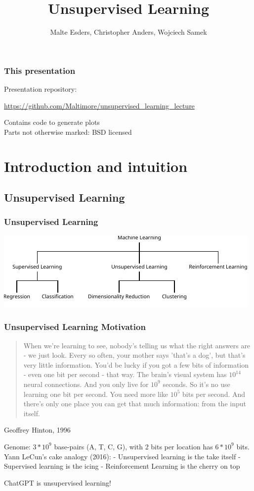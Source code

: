 \documentclass[Nike]{tuberlinbeamer}
\title{Unsupervised Learning}
\author{Malte Esders, Christopher Anders, Wojciech Samek}
\institute{Technische Universität Berlin - Machine Learning Group}
\begin{document}
\frame{\titlepage}


\begin{frame}
  \frametitle{This presentation}
  Presentation repository: \\
  \begin{center}
    \url{https://github.com/Maltimore/unsupervised_learning_lecture}\\
  \end{center}
  Contains code to generate plots\\
  Parts not otherwise marked: BSD licensed
\end{frame}


\section{Introduction and intuition}
\subsection{Unsupervised Learning}

\begin{frame}
 \frametitle{Unsupervised Learning}
  \begin{center}
    \vfill
    \includegraphics[width=\textwidth]{ml_schema}
    \vfill
  \end{center}
\end{frame}

\begin{frame}
 \frametitle{Unsupervised Learning Motivation}
  \begin{center}
    \begin{quote}
      When we’re learning to see, nobody's telling us what the right
      answers are - we just look. Every so often, your mother says
      ’that's a dog’, but that's very little information. You'd be lucky if
      you got a few bits of information - even one bit per second - that
      way. The brain's visual system has $10^{14}$ neural connections. And
      you only live for $10^9$ seconds. So it's no use learning one bit per
      second. You need more like $10^5$ bits per second. And there's only
      one place you can get that much information: from the input
      itself.
    \end{quote}
  Geoffrey Hinton, 1996
  \end{center}
  Genome: $3 * 10^9$ base-pairs (A, T, C, G), with 2 bits per location has  $6 * 10^9$ bits. \\

  \pause
  Yann LeCun's cake analogy (2016):
  - Unsupervised learning is the take itself
  - Supervised learning is the icing
  - Reinforcement Learning is the cherry on top

  \pause
  ChatGPT is unsupervised learning!
\end{frame}
\end{document}
